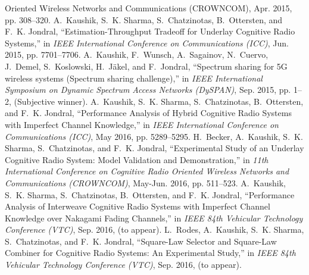 \documentclass[helvetica,nologo,openbib,notitle]{europecv}
\begin{document}
\begin{europecv}
{{  Oriented Wireless Networks and Communications (CROWNCOM)}, Apr. 2015, pp.
  308--320.
\newline
\newline
A.~Kaushik, S.~K. Sharma, S.~Chatzinotas, B.~Ottersten, and F.~K. Jondral,
  ``{{Estimation-Throughput} Tradeoff for Underlay Cognitive Radio Systems},''
  in \emph{{IEEE International Conference on Communications (ICC)}}, Jun. 2015,
  pp. 7701--7706.
\newline
\newline
A.~Kaushik, F.~Wunsch, A.~Sagainov, N.~Cuervo, J.~Demel, S.~Koslowski,
  H.~J\"akel, and F.~Jondral, ``{Spectrum sharing for 5G wireless systems (Spectrum sharing challenge)},'' in \emph{IEEE International Symposium on
  Dynamic Spectrum Access Networks (DySPAN)}, Sep. 2015, pp. 1--2, (Subjective winner).
\newline
\newline
A.~Kaushik, S.~K. Sharma, S.~Chatzinotas, B.~Ottersten, and F.~K. Jondral,
  ``{Performance Analysis of Hybrid Cognitive Radio Systems with Imperfect
  Channel Knowledge},'' in \emph{{IEEE International Conference on
  Communications (ICC)}}, May 2016, pp. 5289--5295.
\newline
\newline
H.~Becker, A.~Kaushik, S.~K. Sharma, S.~Chatzinotas, and F.~K. Jondral,
  ``{Experimental Study of an Underlay Cognitive Radio System: Model Validation
  and Demonstration},'' in \emph{11th International Conference on Cognitive
  Radio Oriented Wireless Networks and Communications (CROWNCOM)}, May-Jun.
  2016, pp. 511--523.
\newline
\newline
A.~Kaushik, S.~K. Sharma, S.~Chatzinotas, B.~Ottersten, and F.~K. Jondral,
  ``{Performance Analysis of Interweave Cognitive Radio Systems with Imperfect
  Channel Knowledge over Nakagami Fading Channels},'' in \emph{{IEEE 84th
  Vehicular Technology Conference (VTC)}}, Sep. 2016, (to appear).
\newline
\newline
L.~Rodes, A.~Kaushik, S.~K. Sharma, S.~Chatzinotas, and F.~K. Jondral,
  ``{Square-Law Selector and Square-Law Combiner for Cognitive Radio Systems:
  An Experimental Study},'' in \emph{{IEEE 84th Vehicular Technology Conference
  (VTC)}}, Sep. 2016, (to appear).
}

\end{europecv}
\end{document}
